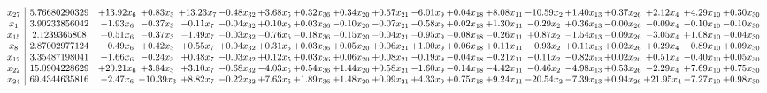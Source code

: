 \documentclass[9pt]{article}
\begin{document}
 \[\begin{array}{c| c c@{\hskip 2pt} c@{\hskip 2pt} c@{\hskip 2pt} c@{\hskip 2pt} c@{\hskip 2pt} c@{\hskip 2pt} c@{\hskip 2pt} c@{\hskip 2pt} c@{\hskip 2pt} c@{\hskip 2pt} c@{\hskip 2pt} c@{\hskip 2pt} c@{\hskip 2pt} c@{\hskip 2pt} c@{\hskip 2pt} c@{\hskip 2pt} c@{\hskip 2pt} }
 x_{27}   &  5.76680290329 & + 13.92 x_{6} & +  0.83 x_{3} & + 13.23 x_{7} & -0.48 x_{32} & +  3.68 x_{5} & +  0.32 x_{36} & +  0.34 x_{20} & +  0.57 x_{21} & -6.01 x_{9} & +  0.04 x_{18} & +  8.08 x_{11} & -10.59 x_{2} & +  1.40 x_{13} & +  0.37 x_{26} & +  2.12 x_{4} & +  4.29 x_{10} & +  0.30 x_{30}\\
 x_{1}   &  3.90233856042 & -1.93 x_{6} & -0.37 x_{3} & -0.11 x_{7} & -0.04 x_{32} & +  0.10 x_{5} & +  0.03 x_{36} & -0.10 x_{20} & -0.07 x_{21} & -0.58 x_{9} & +  0.02 x_{18} & +  1.30 x_{11} & -0.29 x_{2} & +  0.36 x_{13} & -0.00 x_{26} & -0.09 x_{4} & -0.10 x_{10} & -0.10 x_{30}\\
 x_{15}   &  2.1239365808 & +  0.51 x_{6} & -0.37 x_{3} & -1.49 x_{7} & -0.03 x_{32} & -0.76 x_{5} & -0.18 x_{36} & -0.15 x_{20} & -0.04 x_{21} & -0.95 x_{9} & -0.08 x_{18} & -0.26 x_{11} & +  0.87 x_{2} & -1.54 x_{13} & -0.09 x_{26} & -3.05 x_{4} & +  1.08 x_{10} & -0.04 x_{30}\\
 x_{8}   &  2.87002977124 & +  0.49 x_{6} & +  0.42 x_{3} & +  0.55 x_{7} & +  0.04 x_{32} & +  0.31 x_{5} & +  0.03 x_{36} & +  0.05 x_{20} & +  0.06 x_{21} & +  1.00 x_{9} & +  0.06 x_{18} & +  0.11 x_{11} & -0.93 x_{2} & +  0.11 x_{13} & +  0.02 x_{26} & +  0.29 x_{4} & -0.89 x_{10} & +  0.09 x_{30}\\
 x_{12}   &  3.35487198041 & +  1.66 x_{6} & -0.24 x_{3} & +  0.48 x_{7} & -0.03 x_{32} & +  0.12 x_{5} & +  0.03 x_{36} & +  0.06 x_{20} & +  0.08 x_{21} & -0.19 x_{9} & -0.04 x_{18} & -0.21 x_{11} & -0.11 x_{2} & -0.82 x_{13} & +  0.02 x_{26} & +  0.51 x_{4} & -0.40 x_{10} & +  0.05 x_{30}\\
 x_{22}   &  15.0904228629 & + 20.21 x_{6} & +  3.84 x_{3} & +  3.10 x_{7} & -0.68 x_{32} & -4.03 x_{5} & +  0.54 x_{36} & +  1.44 x_{20} & +  0.58 x_{21} & -1.60 x_{9} & -0.14 x_{18} & -4.42 x_{11} & -0.46 x_{2} & -4.98 x_{13} & +  0.53 x_{26} & -2.29 x_{4} & +  7.69 x_{10} & +  0.75 x_{30}\\
 x_{24}   &  69.4344635816 & -2.47 x_{6} & -10.39 x_{3} & +  8.82 x_{7} & -0.22 x_{32} & +  7.63 x_{5} & +  1.89 x_{36} & +  1.48 x_{20} & +  0.99 x_{21} & +  4.33 x_{9} & +  0.75 x_{18} & +  9.24 x_{11} & -20.54 x_{2} & -7.39 x_{13} & +  0.94 x_{26} & + 21.95 x_{4} & -7.27 x_{10} & +  0.98 x_{30}\\

\end{array}\]
\end{document}
